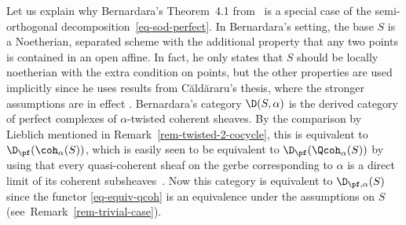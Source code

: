 \begin{remark}
\label{r:bernardara}
Let us explain why Bernardara's Theorem~4.1 from~\cite{bernardara-BS-schemes} is a special case of the semi-orthogonal
decomposition~\eqref{eq-sod-perfect}.
In Bernardara's setting,
the base $S$ is a Noetherian, separated scheme with the additional property that any two points is
contained in an open affine.
In fact, he only states that $S$ should be locally noetherian with the extra condition on points,
but the other properties are used implicitly since he uses results from C{\u{a}}ld{\u{a}}raru's thesis,
where the stronger assumptions are in effect \cite[Section~2.1]{caldararu2000}.
Bernardara's category $\D(S, \alpha)$ is the derived category of perfect complexes of $\alpha$-twisted coherent sheaves.
By the comparison by Lieblich mentioned in Remark~\ref{rem-twisted-2-cocycle},
this is equivalent to $\D_\pf(\coh_\alpha(S))$,
which is easily seen to be equivalent to $\D_\pf(\Qcoh_\alpha(S))$ by using that every quasi-coherent
sheaf on the gerbe corresponding to $\alpha$ is a direct limit of its coherent subsheaves~\cite[Theorem~15.4]{lmb2000}.
Now this category is equivalent to $\D_{\pf, \alpha}(S)$ since the functor \eqref{eq-equiv-qcoh} is an equivalence
under the assumptions on $S$ (see~Remark~\ref{rem-trivial-case}).
\end{remark}

